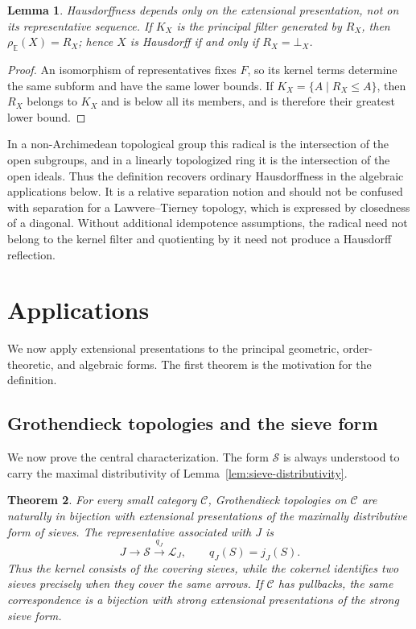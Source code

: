 \documentclass[12pt,oneside,reqno]{amsart}
\newtheorem{theorem}{Theorem}[section]
\newtheorem{lemma}[theorem]{Lemma}
\theoremstyle{definition}
\theoremstyle{remark}
\newcommand{\C}{\mathcal C}
\newcommand{\Sieve}{\mathscr S}
\newcommand{\Sat}{\mathscr L}
\begin{document}
\begin{lemma}\label{lem:hausdorff-intrinsic}
Hausdorffness depends only on the extensional presentation, not on its
representative sequence.  If \(K_X\) is the principal filter generated
by \(R_X\), then \(\rho_{\mathbb E}(X)=R_X\); hence \(X\) is Hausdorff
if and only if \(R_X=\bot_X\).
\end{lemma}

\begin{proof}
An isomorphism of representatives fixes \(F\), so its kernel terms
determine the same subform and have the same lower bounds.  If
\(K_X=\{A\mid R_X\leqslant A\}\), then \(R_X\) belongs to \(K_X\) and
is below all its members, and is therefore their greatest lower bound.
\end{proof}

In a non-Archimedean topological group this radical is the intersection
of the open subgroups, and in a linearly topologized ring it is the
intersection of the open ideals.  Thus the definition recovers ordinary
Hausdorffness in the algebraic applications below.  It is a relative
separation notion and should not be confused with separation for a
Lawvere--Tierney topology, which is expressed by closedness of a
diagonal.  Without additional idempotence assumptions, the radical need
not belong to the kernel filter and quotienting by it need not produce a
Hausdorff reflection.

\section{Applications}
\label{sec:applications}

We now apply extensional presentations to the principal geometric,
order-theoretic, and algebraic forms.  The first theorem is the
motivation for the definition.

\subsection{Grothendieck topologies and the sieve form}

We now prove the central characterization.  The form \(\Sieve\) is
always understood to carry the maximal distributivity of
Lemma~\ref{lem:sieve-distributivity}.

\begin{theorem}\label{thm:main}
For every small category \(\C\), Grothendieck topologies on \(\C\) are
naturally in bijection with extensional presentations of the maximally
distributive form of sieves.  The representative associated with
\(J\) is
\begin{equation}\label{eq:main-short-exact}
 J\longrightarrow\Sieve
 \xrightarrow{\,q_J\,}\Sat_J,
 \qquad q_J(S)=j_J(S).
\end{equation}
Thus the kernel consists of the covering sieves, while the cokernel
identifies two sieves precisely when they cover the same arrows.  If
\(\C\) has pullbacks, the same correspondence is a bijection with strong
extensional presentations of the strong sieve form.
\end{theorem}
\end{document}
